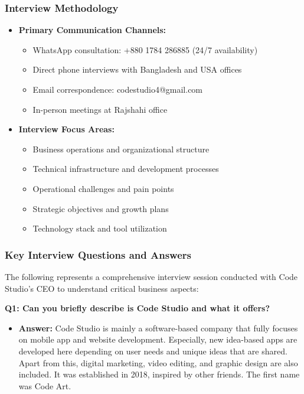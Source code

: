 \documentclass[12pt,a4paper]{article}
\begin{document}
\subsubsection{Interview Methodology}
\begin{itemize}
    \item \textbf{Primary Communication Channels:}
    \begin{itemize}
        \item WhatsApp consultation: +880 1784 286885 (24/7 availability)
        \item Direct phone interviews with Bangladesh and USA offices
        \item Email correspondence: codestudio4@gmail.com
        \item In-person meetings at Rajshahi office
    \end{itemize}
    
    \item \textbf{Interview Focus Areas:}
    \begin{itemize}
        \item Business operations and organizational structure
        \item Technical infrastructure and development processes
        \item Operational challenges and pain points
        \item Strategic objectives and growth plans
        \item Technology stack and tool utilization
    \end{itemize}
\end{itemize}

\subsubsection{Key Interview Questions and Answers}

The following represents a comprehensive interview session conducted with Code Studio's CEO to understand critical business aspects:
\vspace{0.3cm}

\textbf{Q1: Can you briefly describe is Code Studio and what it offers?}
\begin{itemize}
    \item \textbf{Answer:} Code Studio is mainly a software-based company that fully focuses on mobile app and website development. Especially, new idea-based apps are developed here depending on user needs and unique ideas that are shared. Apart from this, digital marketing, video editing, and graphic design are also included. It was established in 2018, inspired by other friends. The first name was Code Art.
\end{itemize}
\end{document}
